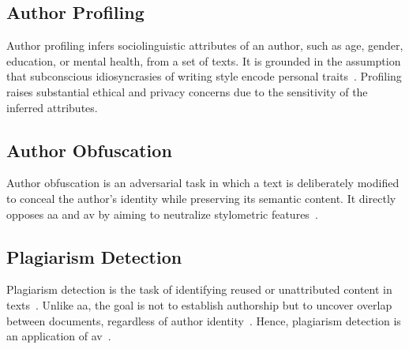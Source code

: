 \subsection{Author Profiling}
Author profiling infers sociolinguistic attributes of an author, such as age, gender, education, or mental health, from a set of texts. 
It is grounded in the assumption that subconscious idiosyncrasies of writing style encode personal traits~\citep{emmery_adversarial_2021,stamatatos_survey_2009,elmanarelbouanani_authorship_2014}. 
Profiling raises substantial ethical and privacy concerns due to the sensitivity of the inferred attributes.

\subsection{Author Obfuscation}
Author obfuscation is an adversarial task in which a text is deliberately modified to conceal the author's identity while preserving its semantic content. 
It directly opposes \ac{aa} and \ac{av} by aiming to neutralize stylometric features~\citep{bischoff_importance_2020,bevendorff_divergence_based_2020,gohsen_task_oriented_2024}. 

\subsection{Plagiarism Detection}
Plagiarism detection is the task of identifying reused or unattributed content in texts~\citep{stein_intrinsic_2011,gohsen_task_oriented_2024}. 
Unlike \ac{aa}, the goal is not to establish authorship but to uncover overlap between documents, regardless of author identity~\citep{elmanarelbouanani_authorship_2014}.
Hence, plagiarism detection is an application of \ac{av}~\citep{rivera_soto_learning_2021}.
